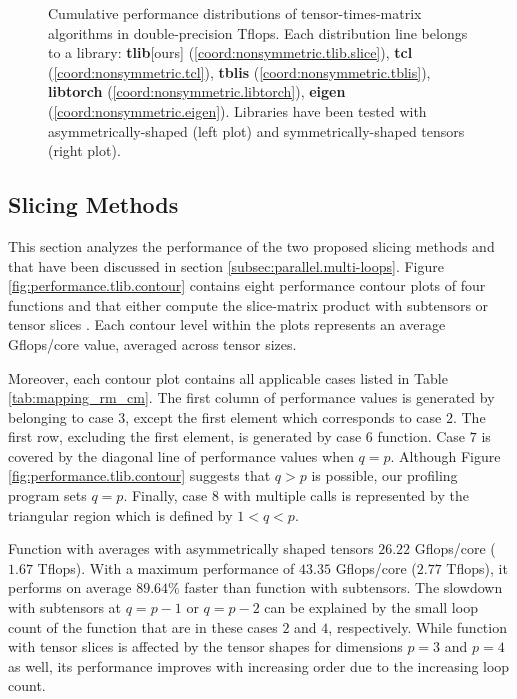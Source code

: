 \begin{figure*}[t]


\caption{ %
\footnotesize%
Cumulative performance distributions of tensor-times-matrix algorithms in double-precision Tflops.
Each distribution line belongs to a library:
\textbf{tlib}[ours] (\ref{coord:nonsymmetric.tlib.slice}), %
\textbf{tcl} (\ref{coord:nonsymmetric.tcl}), %
\textbf{tblis} (\ref{coord:nonsymmetric.tblis}), %
\textbf{libtorch} (\ref{coord:nonsymmetric.libtorch}), %
\textbf{eigen} (\ref{coord:nonsymmetric.eigen}).
Libraries have been tested with asymmetrically-shaped (left plot) and symmetrically-shaped tensors (right plot).
}
\label{fig:performance.comparison}
\end{figure*}


\subsection{Slicing Methods}
This section analyzes the performance of the two proposed slicing methods  and  that have been discussed in section \ref{subsec:parallel.multi-loops}.
Figure \ref{fig:performance.tlib.contour} contains eight performance contour plots of four  functions  and  that either compute the slice-matrix product with subtensors  or tensor slices .
Each contour level within the plots represents an average Gflops/core value, averaged across tensor sizes.

Moreover, each contour plot contains all applicable  cases listed in Table \ref{tab:mapping_rm_cm}.
The first column of performance values is generated by  belonging to case $3$, except the first element which corresponds to case $2$.
The first row, excluding the first element, is generated by case $6$ function.
Case $7$ is covered by the diagonal line of performance values when $q = p$.  
Although Figure \ref{fig:performance.tlib.contour} suggests that $q>p$ is possible, our profiling program sets $q=p$.
Finally, case $8$ with multiple  calls is represented by the triangular region which is defined by $1<q<p$.


Function  with  averages with asymmetrically shaped tensors $26.22$ Gflops/core ($1.67$ Tflops).
With a maximum performance of $43.35$ Gflops/core ($2.77$ Tflops), it performs on average $89.64$\% faster than function  with subtensors.
The slowdown with subtensors at $q=p-1$ or $q=p-2$ can be explained by the small loop count of the function that are in these cases $2$ and $4$, respectively.
While function  with tensor slices is affected by the tensor shapes for dimensions $p=3$ and $p=4$ as well, its performance improves with increasing order due to the increasing loop count.

